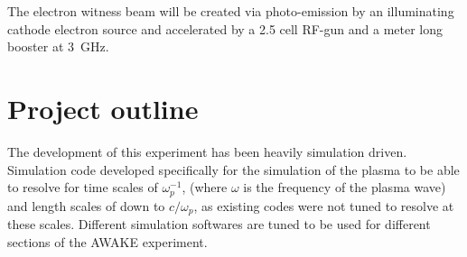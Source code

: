 The electron witness beam will be created via photo-emission by an illuminating
cathode electron source and accelerated by a 2.5 cell RF-gun and a meter long
booster at \SI{3}{\giga\hertz}.


\section{Project outline}


The development of this experiment has been heavily simulation driven.
Simulation code developed specifically for the simulation of the plasma to be
able to resolve for time scales of \(\omega_p^{-1}\), (where \(\omega\) is the
frequency of the plasma wave) and length scales of down to \(c/\omega_p\), as
existing codes were not tuned to resolve at these scales.  Different simulation
softwares are tuned to be used for different sections of the AWAKE experiment.




